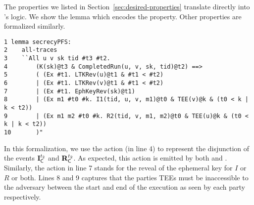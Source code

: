 %

The properties we listed in Section~\ref{sec:desired-properties}
translate directly into \mTamarin's logic.
%
We show the \mTamarin{} lemma which encodes the \mPredPfs{} property.
%
Other properties are formalized similarly. 
%

\begin{small}
\begin{verbatim}
1 lemma secrecyPFS:
2    all-traces
3    ``All u v sk tid #t3 #t2.
4        (K(sk)@t3 & CompletedRun(u, v, sk, tid)@t2) ==>
5        ( (Ex #t1. LTKRev(u)@t1 & #t1 < #t2)
6        | (Ex #t1. LTKRev(v)@t1 & #t1 < #t2)
7        | (Ex #t1. EphKeyRev(sk)@t1)
8        | (Ex m1 #t0 #k. I1(tid, u, v, m1)@t0 & TEE(v)@k & (t0 < k | k < t2))
9        | (Ex m1 m2 #t0 #k. R2(tid, v, m1, m2)@t0 & TEE(u)@k & (t0 < k | k < t2))
10       )"
\end{verbatim}
\end{small}
%

In this formalization, we use the action 
(in line 4) to represent the disjunction of the events $\mathbf{I}_{\textsf{C}}^{t_{2}}$
and $\mathbf{R}_{\textsf{C}}^{t_{2}}$.
%
As expected, this action is emitted by both  and .
%
Similarly, the action  in line 7 stands for the reveal of
the ephemeral key for $I$ or $R$ or both.
%
Lines 8 and 9 captures that the parties TEEs must be inaccessible to the
adversary between the start and end of the execution as seen by each party
respectively.
%
